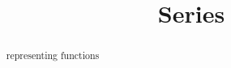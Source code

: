 \documentclass{ximera}
\title{Series}
\begin{document}
\begin{abstract}
representing functions
\end{abstract}
\maketitle
\end{document}

